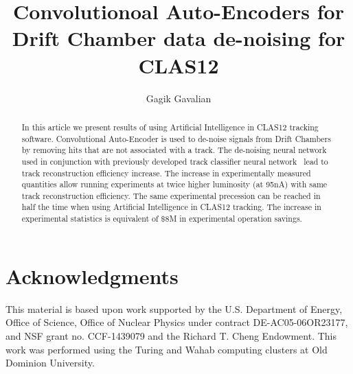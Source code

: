 \documentclass[preprint,12pt]{elsarticle}
\title{Convolutionoal Auto-Encoders for Drift Chamber data de-noising for CLAS12}
\author[1]{Gagik Gavalian}
\begin{document}
\begin{abstract}

In this article we present results of using Artificial Intelligence in CLAS12 tracking software. Convolutional Auto-Encoder is used to de-noise signals from Drift Chambers by removing hits that are not associated with a track.
The de-noising neural network used in conjunction with previously developed track classifier neural network~\cite{Gavalian:2020oxg} lead to track reconstruction efficiency increase. The increase in experimentally measured quantities allow running experiments at twice higher luminosity (at 95nA) with same 
track reconstruction efficiency. The same experimental precession can be reached in half the time when
using Artificial Intelligence in CLAS12 tracking. The increase in experimental statistics is equivalent of $\$8$M in experimental operation savings.

\end{abstract}
\maketitle














%
%



\newpage

\section{Acknowledgments}

This material is based upon work supported by the U.S. Department of Energy, Office of Science,
Office of Nuclear Physics under contract DE-AC05-06OR23177, and NSF grant no. CCF-1439079 and
the Richard T. Cheng Endowment. This work was performed using the Turing and Wahab computing
clusters at Old Dominion University.
 
\newpage


\end{document}

